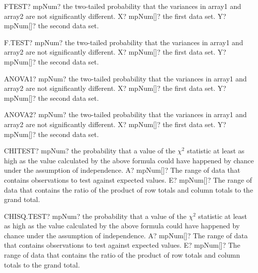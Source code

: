 \documentclass[12pt,a4paper,openany]{book}
\begin{document}
\begin{mpFunctionsExtract}
\mpWorksheetFunctionTwoNotImplemented
{FTEST? mpNum? the two-tailed probability that the variances in array1 and array2 are not significantly different.}
{X? mpNum[]? the first data set.}
{Y? mpNum[]? the second data set.}
\end{mpFunctionsExtract}

\begin{mpFunctionsExtract}
\mpWorksheetFunctionTwoNotImplemented
{F.TEST? mpNum? the two-tailed probability that the variances in array1 and array2 are not significantly different.}
{X? mpNum[]? the first data set.}
{Y? mpNum[]? the second data set.}
\end{mpFunctionsExtract}

\begin{mpFunctionsExtract}
\mpFunctionTwoNotImplemented
{ANOVA1? mpNum? the two-tailed probability that the variances in array1 and array2 are not significantly different.}
{X? mpNum[]? the first data set.}
{Y? mpNum[]? the second data set.}
\end{mpFunctionsExtract}

\begin{mpFunctionsExtract}
\mpFunctionTwoNotImplemented
{ANOVA2? mpNum? the two-tailed probability that the variances in array1 and array2 are not significantly different.}
{X? mpNum[]? the first data set.}
{Y? mpNum[]? the second data set.}
\end{mpFunctionsExtract}

\begin{mpFunctionsExtract}
\mpWorksheetFunctionTwoNotImplemented
{CHITEST? mpNum? the probability that a value of the $\chi^2$ statistic at least as high as the value calculated by the above formula could have happened by chance under the assumption of independence.}
{A? mpNum[]? The range of data that contains observations to test against expected values.}
{E? mpNum[]? The range of data that contains the ratio of the product of row totals and column totals to the grand total.}
\end{mpFunctionsExtract}

\begin{mpFunctionsExtract}
\mpWorksheetFunctionTwoNotImplemented
{CHISQ.TEST? mpNum? the probability that a value of the $\chi^2$ statistic at least as high as the value calculated by the above formula could have happened by chance under the assumption of independence.}
{A? mpNum[]? The range of data that contains observations to test against expected values.}
{E? mpNum[]? The range of data that contains the ratio of the product of row totals and column totals to the grand total.}
\end{mpFunctionsExtract}
\end{document}
